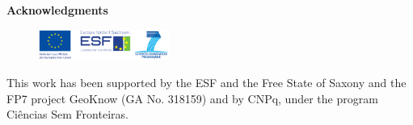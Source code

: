 \documentclass{acm_proc_article-sp}
\begin{document}
\textbf{Acknowledgments}
\begin{figure}
 \vspace{-8mm}
 {\includegraphics[height=1cm]{esf.pdf}}\,{\includegraphics[height=1cm]{7fp.png}}
\end{figure}
This work has been supported by the ESF and the Free State of Saxony and the FP7 project GeoKnow (GA No. 318159) and by CNPq, under the program Ciências Sem Fronteiras.
\vspace{-5mm}


\end{document}

